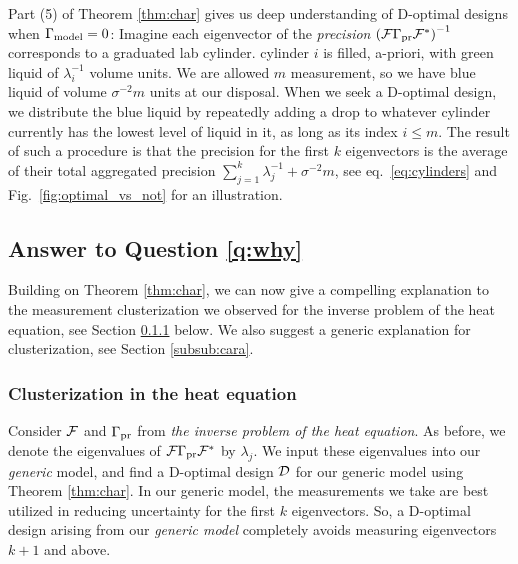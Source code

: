 Part (5) of Theorem \ref{thm:char} gives us deep understanding of
D-optimal designs when $\Gamma_{\textup{model}} = 0$: Imagine each eigenvector of the
\emph{precision} $\left(\mathcal{F} \Gamma_{\textup{pr}} \mathcal{F}^*\right )^{-1}$ corresponds
to a graduated lab cylinder. %
cylinder $i$ is filled, a-priori, with green liquid of
$\lambda_i^{-1}$ volume units. We are allowed $m$ measurement, so we
have blue liquid of volume $\sigma^{-2}m$ units at our disposal. When
we seek a D-optimal design, we distribute the blue liquid by
repeatedly adding a drop to whatever cylinder currently has the lowest
level of liquid in it, as long as its index $i \leq m$. The result of
such a procedure is that the precision for the first $k$ eigenvectors
is the average of their total aggregated precision $\sum_{j=1}^k
\lambda_j^{-1} + \sigma^{-2}m$, see eq.~\eqref{eq:cylinders} and
Fig.~\ref{fig:optimal_vs_not} for an illustration.

\subsection{Answer to Question \ref{q:why}}\label{subsec:why}
Building on Theorem \ref{thm:char}, we can now give a compelling
explanation to the measurement clusterization we observed for the
inverse problem of the heat equation, see Section
\ref{subsub:clusterization1} below. We also suggest a generic
explanation for clusterization, see Section \ref{subsub:cara}.

\subsubsection{Clusterization in the heat equation}\label{subsub:clusterization1}
Consider $\mathcal{F}$ and $\Gamma_{\textup{pr}}$ from \emph{the inverse problem of the
heat equation}. As before, we denote the eigenvalues of
$\mathcal{F}\Gamma_{\textup{pr}}\mathcal{F}^*$ by $\lambda_j$. We input these eigenvalues into our
\emph{generic} model, and find a D-optimal design $\mathcal{D}$ for our
generic model using Theorem \ref{thm:char}. In our generic model, the
measurements we take are best utilized in reducing uncertainty for the
first $k$ eigenvectors. So, a D-optimal design arising from our
\emph{generic model} completely avoids measuring eigenvectors $k+1$
and above.

